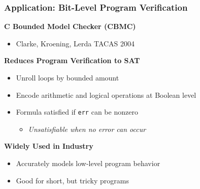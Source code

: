 \documentclass[t,pdf]{beamer}
\begin{document}
\begin{frame}
  \frametitle{Application: Bit-Level Program Verification}
      {\bf C Bounded Model Checker (CBMC)}
      \begin{itemize}
      \item Clarke, Kroening, Lerda  TACAS 2004
      \end{itemize}
\medskip
      {\bf Reduces Program Verification to SAT}
      \begin{itemize}
      \item Unroll loops by bounded amount
      \item Encode arithmetic and logical operations at Boolean level
      \item Formula satisfied if {\tt err} can be nonzero
        \begin{itemize}
          \item {\em Unsatisfiable when no error can occur}
        \end{itemize}
      \end{itemize}
      \medskip
      {\bf Widely Used in Industry}
      \begin{itemize}
      \item Accurately models low-level program behavior
      \item Good for short, but tricky programs
      \end{itemize}

\end{frame}
\end{document}

